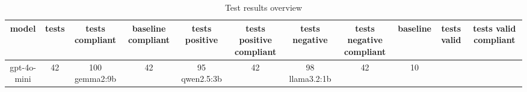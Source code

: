 
  \begin{table}[h!]
  \centering
  \begin{tabular}{|c|c|c|c|c|c|c|c|c|c|c|}
  \hline
  model & tests & tests compliant & baseline compliant & tests positive & tests positive compliant & tests negative & tests negative compliant & baseline & tests valid & tests valid compliant \\
  \hline
  gpt-4o-mini & 42 & 100%
\hline
gemma2:9b & 42 & 95%
\hline
qwen2.5:3b & 42 & 98%
\hline
llama3.2:1b & 42 & 10%
  \end{tabular}
  \caption{Test results overview}
  
  \end{table}
  